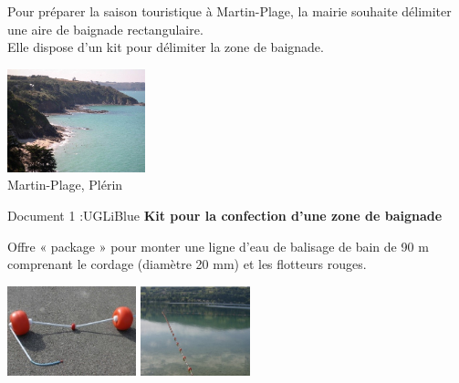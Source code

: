 \documentclass[a4paper,12pt,exos]{nsi}
\begin{document}
    \maketitle

    \begin{minipage}{12cm}
        Pour préparer la saison touristique à Martin-Plage, la mairie souhaite délimiter une aire de baignade rectangulaire.\\
        Elle dispose d'un kit pour délimiter la zone de baignade.
    \end{minipage}
    \begin{minipage}{5cm}
        \flushright \includegraphics[width=4cm]{martinplage}\\
        \small Martin-Plage, Plérin
    \end{minipage}
    
    \begin{encadrecolore}{Document 1 :}{UGLiBlue}
        \textbf{Kit pour la confection d'une zone de baignade}\\
        
        \begin{minipage}{8cm}
            Offre « package » pour monter une ligne d'eau de balisage de bain de 90 m comprenant le cordage (diamètre 20 mm) et les flotteurs rouges.
        \end{minipage}
        \begin{minipage}{8cm}
            \flushright \includegraphics[height=2.6cm]{flotteurs} \hspace{.2cm} \includegraphics[height=2.6cm]{flotteurs2}
        \end{minipage}
    \end{encadrecolore}
    
\end{document}
